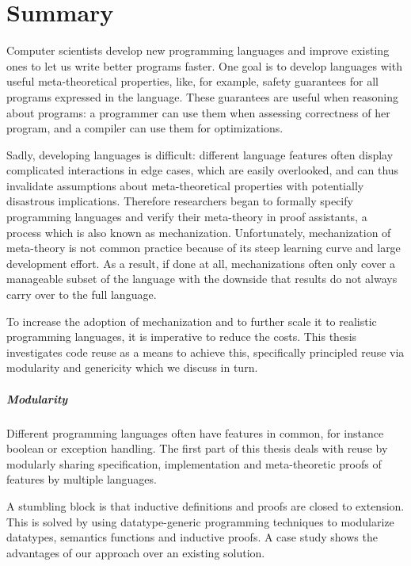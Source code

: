 \chapter*{Summary}

Computer scientists develop new programming languages and improve existing ones
to let us write better programs faster. One goal is to develop languages with
useful meta-theoretical properties, like, for example, safety guarantees for all
programs expressed in the language. These guarantees are useful when reasoning
about programs: a programmer can use them when assessing correctness of her
program, and a compiler can use them for optimizations.

Sadly, developing languages is difficult: different language features often
display complicated interactions in edge cases, which are easily overlooked, and
can thus invalidate assumptions about meta-theoretical properties with
potentially disastrous implications. Therefore researchers began to formally
specify programming languages and verify their meta-theory in proof assistants,
a process which is also known as mechanization. Unfortunately, mechanization of
meta-theory is not common practice because of its steep learning curve and large
development effort. As a result, if done at all, mechanizations often only cover
a manageable subset of the language with the downside that results do not always
carry over to the full language.

To increase the adoption of mechanization and to further scale it to realistic
programming languages, it is imperative to reduce the costs. This thesis
investigates code reuse as a means to achieve this, specifically principled
reuse via modularity and genericity which we discuss in turn.

\paragraph{Modularity}
Different programming languages often have features in common, for instance
boolean or exception handling. The first part of this thesis deals with reuse by
modularly sharing specification, implementation and meta-theoretic proofs of
features by multiple languages.

A stumbling block is that inductive definitions and proofs are closed to
extension. This is solved by using datatype-generic programming techniques to
modularize datatypes, semantics functions and inductive proofs. A case study
shows the advantages of our approach over an existing solution.

